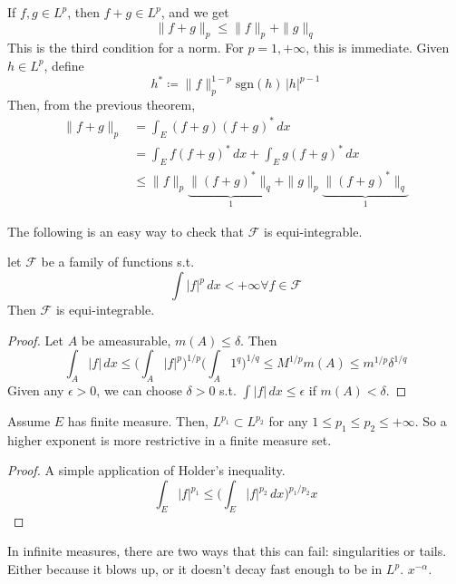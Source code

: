   \begin{theorem}[Minkowski]
    If $f, g \in L^p$, then $f + g \in L^p$, and we get 
    \begin{equation}
      \| f + g \|_p \leq \|f\|_p + \|g\|_q
    \end{equation}
    This is the third condition for a norm. For $p = 1, +\infty$, this is immediate. Given $h \in L^p$, define 
    \begin{equation}
      h^\ast \coloneqq \|f\|_p^{1-p} \mathrm{sgn}(h) \, |h|^{p-1} 
    \end{equation}
    Then, from the previous theorem, 
    \begin{align}
      \| f + g \|_p & = \int_E (f + g)(f + g)^\ast \,dx  \\ 
                    & = \int_E f (f + g)^\ast \,dx + \int_E g (f + g)^\ast \,dx  \\ 
                    & \leq \|f\|_p \underbrace{\|(f + g)^\ast\|_q}_{1} + \|g\|_p \underbrace{\|(f + g)^\ast\|_q}_{1} 
    \end{align}
  \end{theorem}

  The following is an easy way to check that $\mathscr{F}$ is equi-integrable. 

  \begin{corollary}
    let $\mathscr{F}$ be a family of functions s.t. 
    \begin{equation}
      \int |f|^p \,dx < +\infty \forall f \in \mathscr{F}
    \end{equation}
    Then $\mathscr{F}$ is equi-integrable. 
  \end{corollary}
  \begin{proof}
    Let $A$ be ameasurable, $m(A) \leq \delta$. Then 
    \begin{equation}
      \int_A |f| \,dx \leq \bigg( \int_A |f|^p \bigg)^{1/p} \bigg( \int_A 1^q \bigg)^{1/q} \leq M^{1/p} m(A) \leq m^{1/p} \delta^{1/q} 
    \end{equation}
    Given any $\epsilon > 0$, we can choose $\delta > 0$ s.t. $\int |f| \,dx \leq \epsilon$ if $m(A) < \delta$. 
  \end{proof}

  \begin{corollary}
    Assume $E$ has finite measure. Then, $L^{p_1} \subset L^{p_2}$ for any $1 \leq p_1 \leq p_2 \leq +\infty$. So a higher exponent is more restrictive in a finite measure set. 
  \end{corollary}
  \begin{proof}
    A simple application of Holder's inequality. 
    \begin{equation}
      \int_E |f|^{p_1} \leq \bigg( \int_E |f|^{p_2} \,dx \bigg)^{p_1/p_2} x 
    \end{equation}
  \end{proof}

  In infinite measures, there are two ways that this can fail: singularities or tails. Either because it blows up, or it doesn't decay fast enough to be in $L^p$. $x^{-\alpha}$. 

